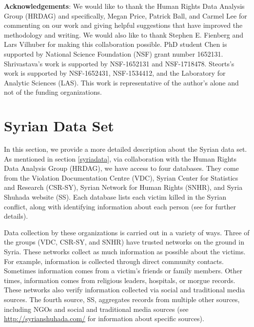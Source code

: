 \documentclass{imsart}
\begin{document}
%

\textbf{Acknowledgements}: We would like to thank the Human Rights Data Analysis Group (HRDAG) and specifically, Megan Price, Patrick Ball, and Carmel Lee for commenting on our work and giving helpful suggestions that have improved the methodology and writing. We would also like to thank Stephen E. Fienberg and Lars Vilhuber for making this collaboration possible. PhD student Chen is supported by National Science Foundation (NSF) grant number 1652131. Shrivastava's work is supported by NSF-1652131 and NSF-1718478. Steorts's work is supported by NSF-1652431, NSF-1534412, and the Laboratory for Analytic Sciences (LAS). This work is representative of the author's alone and not of the funding organizations.
\clearpage
\newpage

%
%
%



\clearpage
\newpage

\appendix

\section{Syrian Data Set}
\label{sec:syrian}
In this section, we provide a more detailed description about the Syrian data set. As mentioned in section \ref{syriadata}, via
collaboration with the Human Rights Data Analysis Group (HRDAG), we have access to four databases. They come from the Violation Documentation Centre (VDC), Syrian Center for Statistics and Research (CSR-SY), Syrian Network for Human Rights (SNHR), and Syria Shuhada website (SS). Each database lists each victim killed in the Syrian conflict, along with identifying information about each person (see \cite{price_2013} for further details).

Data collection by these organizations is carried out in a variety of ways. Three of the groups (VDC, CSR-SY, and SNHR) have trusted networks on the ground in Syria.  These networks collect as much information as possible about the victims. For example, information is collected  through direct community contacts. Sometimes information comes from a victim's friends or family members. Other times, information comes from religious leaders, hospitals, or morgue records.  These networks also verify information collected via social and traditional media sources.  The fourth source, SS, aggregates records from multiple other sources, including NGOs and social and traditional media sources (see \url{http://syrianshuhada.com/} for information about specific sources).
\end{document}
